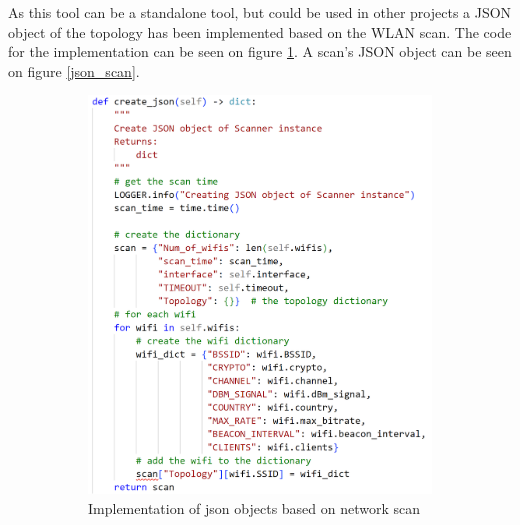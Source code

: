 As this tool can be a standalone tool, but could be used in other projects a JSON object of the topology has been implemented based on the WLAN scan. The code for the implementation can be seen on figure \ref{create_json_code}. A scan's JSON object can be seen on figure \ref{json_scan}.

\begin{figure}[!htbp]
    \centering
     \begin{subfigure}{0.49\textwidth}
         \centering
         \includegraphics[width=\textwidth]{Latex-Files/Billeder/create_json_code.png}
         \caption{Implementation of json objects based on network scan}
         \label{create_json_code}
     \end{subfigure}
      \begin{subfigure}{0.49\textwidth}
         \centering

\end{subfigure}
\end{figure}
